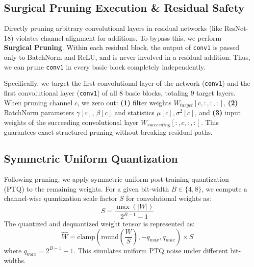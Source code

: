 \documentclass{article}
\theoremstyle{plain}
\theoremstyle{definition}
\theoremstyle{remark}
\begin{document}
\subsection{Surgical Pruning Execution \& Residual Safety}
Directly pruning arbitrary convolutional layers in residual networks (like ResNet-18) violates channel alignment for additions. To bypass this, we perform \textbf{Surgical Pruning}. Within each residual block, the output of \texttt{conv1} is passed only to BatchNorm and ReLU, and is never involved in a residual addition. Thus, we can prune \texttt{conv1} in every basic block completely independently.

Specifically, we target the first convolutional layer of the network (\texttt{conv1}) and the first convolutional layer (\texttt{conv1}) of all 8 basic blocks, totaling 9 target layers. When pruning channel $c$, we zero out: \textbf{(1)} filter weights $W_{target}[c, :, :, :]$, \textbf{(2)} BatchNorm parameters $\gamma[c]$, $\beta[c]$ and statistics $\mu[c], \sigma^2[c]$, and \textbf{(3)} input weights of the succeeding convolutional layer $W_{succeeding}[:, c, :, :]$. This guarantees exact structured pruning without breaking residual paths.

\subsection{Symmetric Uniform Quantization}
Following pruning, we apply symmetric uniform post-training quantization (PTQ) to the remaining weights. For a given bit-width $B \in \{4, 8\}$, we compute a channel-wise quantization scale factor $S$ for convolutional weights as:
\begin{equation}
    S = \frac{\max(|W|)}{2^{B-1} - 1}
\end{equation}
The quantized and dequantized weight tensor is represented as:
\begin{equation}
    \hat{W} = \text{clamp}\left(\text{round}\left(\frac{W}{S}\right), -q_{max}, q_{max}\right) \times S
\end{equation}
where $q_{max} = 2^{B-1} - 1$. This simulates uniform PTQ noise under different bit-widths.
\end{document}
